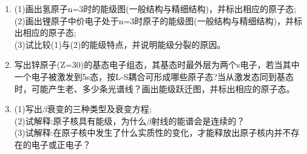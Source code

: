 \begin{enumerate}
\item (1)画出氢原子n=3时的能级图(一般结构与精细结构)，并标出相应的原子态;\\
(2)画出锂原子中价电子处于n=3时原子的能级图(一般结构与精细结构)，并标出相应的原子态;\\
(3)试比较(1)与(2)的能级特点，并说明能级分裂的原因。
\item 写出锌原子(Z=30)的基态电子组态，其基态时最外层为两个s电子，若当其中一个电子被激发到5s态，按L-S耦合可形成哪些原子态?当从激发态同到基态时，可能产生老、多少条光谱线？画出能级跃迁图，并标出相应的原子态。
\item (1)写出$\beta$衰变的三种类型及衰变方程;\\
(2)试解释:原子核具有能级，为什么$\beta$射线的能谱会是连续的？\\
(3)试解释:在原子核中发生了什么实质性的变化，才能释放出原子核内并不存在的电子或正电子？
\end{enumerate} 
